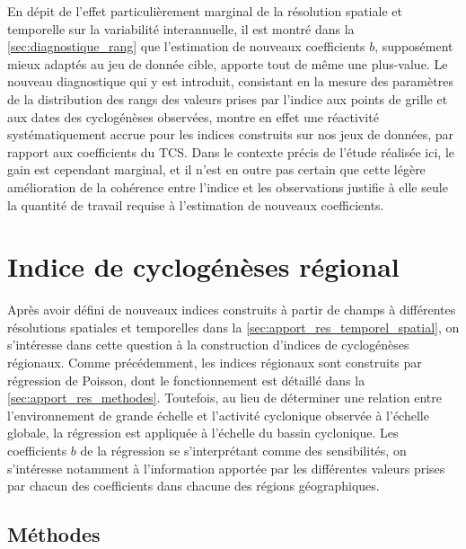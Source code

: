 \documentclass[../main.tex]{subfiles}
\begin{document}
En dépit de l'effet particulièrement marginal de la résolution spatiale et temporelle sur la variabilité interannuelle, il est montré dans la
\cref{sec:diagnostique_rang} que l'estimation de nouveaux coefficients $b$, supposément mieux adaptés au jeu de donnée cible, apporte tout de même une
plus-value. Le nouveau diagnostique qui y est introduit, consistant en la mesure des paramètres de la distribution des rangs des valeurs prises par l'indice aux
points de grille et aux dates des cyclogénèses observées, montre en effet une réactivité systématiquement accrue pour les indices construits sur nos jeux de
données, par rapport aux coefficients du TCS. Dans le contexte précis de l'étude réalisée ici, le gain est cependant marginal, et il n'est en outre pas certain
que cette légère amélioration de la cohérence entre l'indice et les observations justifie à elle seule la quantité de travail requise à l'estimation de nouveaux
coefficients.

\section{Indice de cyclogénèses régional}

Après avoir défini de nouveaux indices construits à partir de champs à différentes résolutions spatiales et temporelles dans la
\cref{sec:apport_res_temporel_spatial}, on s'intéresse dans cette question à la construction d'indices de cyclogénèses régionaux. Comme précédemment, les
indices régionaux sont construits par régression de Poisson, dont le fonctionnement est détaillé dans la \cref{sec:apport_res_methodes}. Toutefois, au lieu de
déterminer une relation entre l'environnement de grande échelle et l'activité cyclonique observée à l'échelle globale, la régression est appliquée à l'échelle
du bassin cyclonique. Les coefficients $b$ de la régression se s'interprétant comme des sensibilités, on s'intéresse notamment à l'information apportée par les
différentes valeurs prises par chacun des coefficients dans chacune des régions géographiques.

\subsection{Méthodes}
\end{document}
